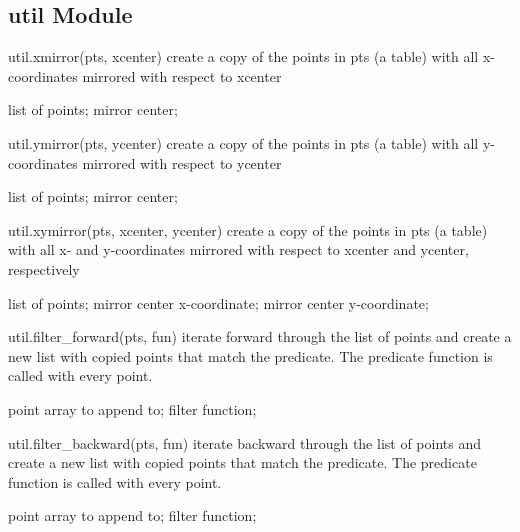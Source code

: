 \subsection{util Module}
\begin{APIfunc}{util.xmirror(pts, xcenter)}
    create a copy of the points in pts (a table) with all x-coordinates mirrored with respect to xcenter
    \begin{APIparameters}
            list of points;
            mirror center;
    \end{APIparameters}
\end{APIfunc}
\begin{APIfunc}{util.ymirror(pts, ycenter)}
    create a copy of the points in pts (a table) with all y-coordinates mirrored with respect to ycenter
    \begin{APIparameters}
            list of points;
            mirror center;
    \end{APIparameters}
\end{APIfunc}
\begin{APIfunc}{util.xymirror(pts, xcenter, ycenter)}
    create a copy of the points in pts (a table) with all x- and y-coordinates mirrored with respect to xcenter and ycenter, respectively
    \begin{APIparameters}
            list of points;
            mirror center x-coordinate;
            mirror center y-coordinate;
    \end{APIparameters}
\end{APIfunc}
\begin{APIfunc}{util.filter\_forward(pts, fun)}
    iterate forward through the list of points and create a new list with copied points that match the predicate. The predicate function is called with every point.
    \begin{APIparameters}
            point array to append to;
            filter function;
    \end{APIparameters}
\end{APIfunc}
\begin{APIfunc}{util.filter\_backward(pts, fun)}
    iterate backward through the list of points and create a new list with copied points that match the predicate. The predicate function is called with every point.
    \begin{APIparameters}
            point array to append to;
            filter function;
    \end{APIparameters}
\end{APIfunc}
